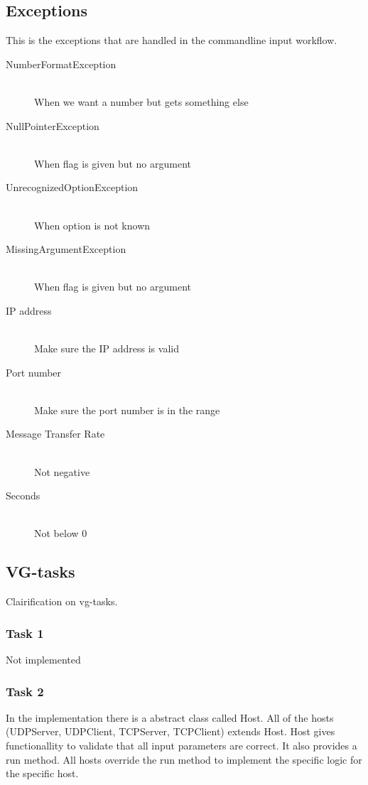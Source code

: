 \documentclass[a4paper,12pt]{article} %
\begin{document}
{\subsection{Exceptions}

This is the exceptions that are handled in the commandline input workflow.

\begin{description}
  \item[NumberFormatException] \hfill \\
    When we want a number but gets something else
  \item[NullPointerException] \hfill \\
    When flag is given but no argument
  \item[UnrecognizedOptionException] \hfill \\
    When option is not known
  \item[MissingArgumentException] \hfill \\
    When flag is given but no argument
  \item[IP address] \hfill \\
    Make sure the IP address is valid
  \item[Port number] \hfill \\
    Make sure the port number is in the range
  \item[Message Transfer Rate] \hfill \\
    Not negative
  \item[Seconds ] \hfill \\
    Not below 0

\end{description}


\subsection{VG-tasks}

Clairification on vg-tasks.

\subsubsection{Task 1}

Not implemented

\subsubsection{Task 2}
\label{sec:task2}
In the implementation there is a abstract class called Host.
All of the hosts (UDPServer, UDPClient, TCPServer, TCPClient) extends Host.
Host gives functionallity to validate that all input parameters are correct.
It also provides a run method. All hosts override the run method to implement 
the specific logic for the specific host.

}
\end{document}
